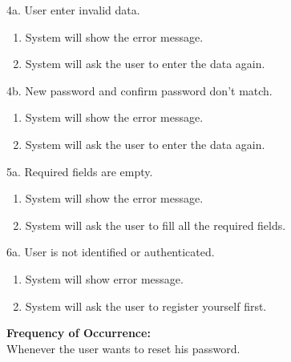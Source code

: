 \documentclass[12pt]{article}
\begin{document}
4a. User enter invalid data.
\begin{enumerate}
\item System will show the error message.
\item System will ask the user to enter the data again.
\end{enumerate}
4b. New password and confirm password don't match.
\begin{enumerate}
\item System will show the error message.
\item System will ask the user to enter the data again.
\end{enumerate}
5a. Required fields are empty.
\begin{enumerate}
\item System will show the error message.
\item System will ask the user to fill all the required fields.
\end{enumerate}
6a. User is not identified or authenticated.
\begin{enumerate}
\item System will show error message.
\item System will ask the user to register yourself first.
\end{enumerate}
\textbf{Frequency of Occurrence:}\\
Whenever the user wants to reset his password.
\end{document}

